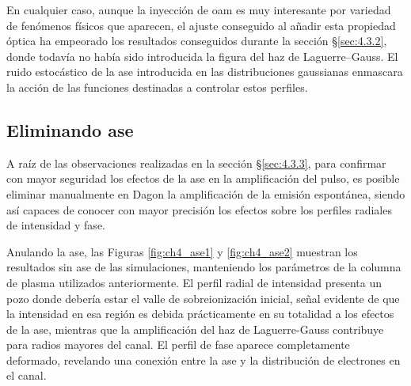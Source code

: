 En cualquier caso, aunque la inyección de \acrshort{oam} es muy interesante por variedad de fenómenos físicos que aparecen, el ajuste conseguido al añadir esta propiedad óptica ha empeorado los resultados conseguidos durante la sección \S\ref{sec:4.3.2}, donde todavía no había sido introducida la figura del haz de Laguerre--Gauss. El ruido estocástico de la \acrshort{ase} introducida en las distribuciones gaussianas enmascara la acción de las funciones destinadas a controlar estos perfiles.

\subsection{Eliminando \acrshort{ase}}\label{sec:4.3.4}
A raíz de las observaciones realizadas en la sección \S\ref{sec:4.3.3}, para confirmar con mayor seguridad los efectos de la \acrshort{ase} en la amplificación del pulso, es posible eliminar manualmente en Dagon la amplificación de la emisión espontánea, siendo así capaces de conocer con mayor precisión los efectos sobre los perfiles radiales de intensidad y fase.

Anulando la \acrshort{ase}, las Figuras \ref{fig:ch4_ase1} y \ref{fig:ch4_ase2} muestran los resultados sin \acrshort{ase} de las simulaciones, manteniendo los parámetros de la columna de plasma utilizados anteriormente. El perfil radial de intensidad presenta un pozo donde debería estar el valle de sobreionización inicial, señal evidente de que la intensidad en esa región es debida prácticamente en su totalidad a los efectos de la \acrshort{ase}, mientras que la amplificación del haz de Laguerre-Gauss contribuye para radios mayores del canal. El perfil de fase aparece completamente deformado, revelando una conexión entre la \acrshort{ase} y la distribución de electrones en el canal.

